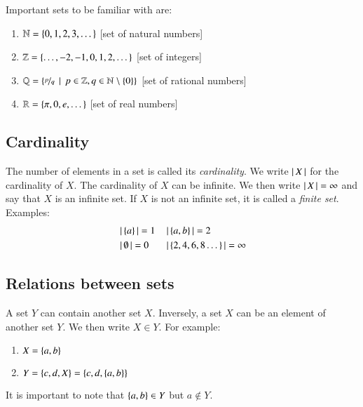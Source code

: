 \documentclass[nobib,nofonts]{tufte-handout}
\newcommand{\mygray}[1]{\textcolor{mygray2}{#1}}
\begin{document}
Important sets to be familiar with are:
\begin{enumerate}[]
\item $\mathbb{N} = \left\{0, 1,2,3, \dots\right\}$ \hfill \mygray{[set of natural numbers]}
\item $\mathbb{Z} = \left\{\dots, -2, -1, 0, 1, 2, \dots\right\}$ \hfill \mygray{[set of integers]}
\item $\mathbb{Q} = \left\{\nicefrac{p}{q} \thinspace \mid \thinspace p \in \mathbb{Z}, q \in \mathbb{N} \setminus \left\{0\right\}\right\}$ \hfill \mygray{[set of rational
    numbers]}
\item $\mathbb{R} = \left\{\pi, 0, e, \dots\right\}$ \hfill \mygray{[set of real numbers]}
\end{enumerate}

\subsection{Cardinality}

The number of elements in a set is called its \emph{cardinality}.
We write $\left \lvert \, X \, \right\rvert$ for the cardinality of $X$. The cardinality of $X$ can be infinite.
We then write $\left \lvert \, X \, \right\rvert = \infty$ and say that $X$ is an infinite set.
If $X$ is not an infinite set, it is called a \emph{finite set}.
Examples:
\begin{align*}
  &\left \lvert \, \left\{a\right\} \, \right\rvert = 1 && \left \lvert \, \left\{a,b\right\} \, \right\rvert = 2 \\
  & \left \lvert \, \emptyset \, \right\rvert = 0    && \left \lvert \, \left\{2,4,6,8 \dots\right\} \, \right\rvert = \infty
\end{align*}

\subsection{Relations between sets}

A set $Y$ can contain another set $X$. Inversely, a set $X$ can be an element of another set
$Y$. We then write $X \in Y$. For example:
\begin{enumerate}[]
  \item $X = \left\{a,b\right\}$ 
  \item $Y = \left\{c, d, X\right\} = \left\{c, d, \left\{a,b\right\}\right\}$
\end{enumerate}
It is important to note that $\left\{a,b\right\} \in Y$ but $a \not \in Y$. 
\end{document}
